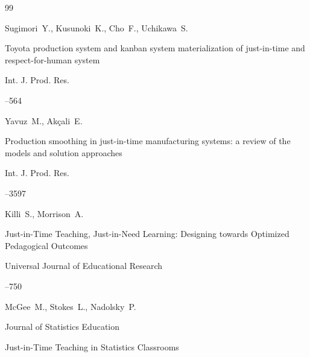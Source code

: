 \begin{thebibliography}{99}




\by Sugimori~Y., Kusunoki~K., Cho~F., Uchikawa~S.

\paper Toyota production system and kanban system materialization of just-in-time and respect-for-human system

\jour Int. J. Prod. Res.



--564 



  


\by Yavuz~M., Ak\c{c}ali~E.

\paper Production smoothing in just-in-time manufacturing systems: a review of the models and solution approaches

\jour Int. J. Prod. Res.



--3597 






\by Killi~S., Morrison~A.

\paper Just-in-Time Teaching, Just-in-Need Learning: Designing towards Optimized Pedagogical Outcomes

\jour  Universal Journal of Educational Research



--750 






\by McGee~M., Stokes~L., Nadolsky~P.

\jour Journal of Statistics Education


\paper Just-in-Time Teaching in Statistics Classrooms



\end{thebibliography}
